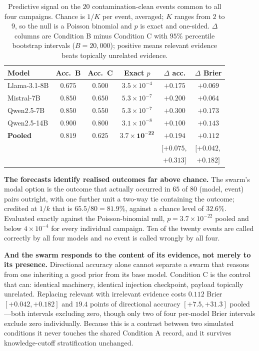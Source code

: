 \documentclass[10pt,conference]{IEEEtran}
\begin{document}
\begin{table}[!t]
\centering
\caption{Predictive signal on the $20$ contamination-clean events common to all four campaigns. Chance is $1/K$ per event, averaged; $K$ ranges from $2$ to $9$, so the null is a Poisson binomial and $p$ is exact and one-sided. $\Delta$ columns are Condition B minus Condition C with $95\%$ percentile bootstrap intervals ($B=20{,}000$); positive means relevant evidence beats topically unrelated evidence.}
\label{tab:signal}
\footnotesize
\setlength{\tabcolsep}{2pt}
\begin{tabular}{lccccc}
\toprule
\textbf{Model} & \textbf{Acc.\ B} & \textbf{Acc.\ C} & \textbf{Exact $p$} & \textbf{$\Delta$ acc.} & \textbf{$\Delta$ Brier} \\
\midrule
Llama-3.1-8B & $0.675$ & $0.500$ & $3.5\times10^{-4}$ & $+0.175$ & $+0.069$ \\
Mistral-7B   & $0.850$ & $0.650$ & $5.3\times10^{-7}$ & $+0.200$ & $+0.064$ \\
Qwen2.5-7B   & $0.850$ & $0.550$ & $5.3\times10^{-7}$ & $+0.300$ & $\mathbf{+0.173}$ \\
Qwen2.5-14B  & $\mathbf{0.900}$ & $0.800$ & $3.1\times10^{-8}$ & $+0.100$ & $\mathbf{+0.143}$ \\
\midrule
\textbf{Pooled} & $\mathbf{0.819}$ & $0.625$ & $\mathbf{3.7\times10^{-22}}$ & $\mathbf{+0.194}$ & $\mathbf{+0.112}$ \\
 & & & & $[+0.075,$ & $[+0.042,$ \\
 & & & & $+0.313]$ & $+0.182]$ \\
\bottomrule
\end{tabular}
\end{table}

\textbf{The forecasts identify realised outcomes far above chance.} The swarm's modal option is the outcome that actually occurred in $65$ of $80$ (model, event) pairs outright, with one further unit a two-way tie containing the outcome; credited at $1/k$ that is $65.5/80 = 81.9\%$, against a chance level of $32.6\%$. Evaluated exactly against the Poisson-binomial null, $p = 3.7\times10^{-22}$ pooled and below $4\times10^{-4}$ for every individual campaign. Ten of the twenty events are called correctly by all four models and \emph{no} event is called wrongly by all four.

\textbf{And the swarm responds to the content of its evidence, not merely to its presence.} Directional accuracy alone cannot separate a swarm that reasons from one inheriting a good prior from its base model. Condition C is the control that can: identical machinery, identical injection checkpoint, payload topically unrelated. Replacing relevant with irrelevant evidence costs $0.112$ Brier $[+0.042, +0.182]$ and $19.4$ points of directional accuracy $[+7.5, +31.3]$ pooled---both intervals excluding zero, though only two of four per-model Brier intervals exclude zero individually. Because this is a contrast between two simulated conditions it never touches the shared Condition A record, and it survives knowledge-cutoff stratification unchanged.
\end{document}
